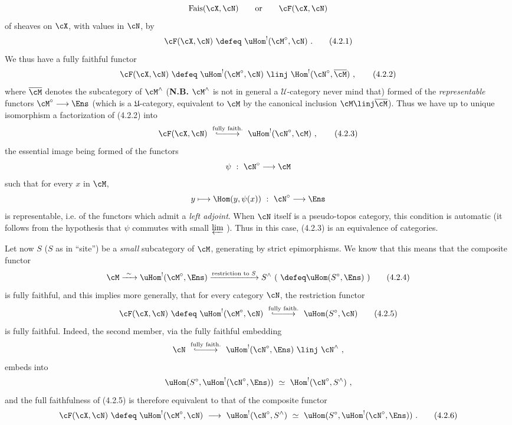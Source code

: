 \[
\mathrm{Fais}(\cX,\cN) \qquad \text{or} \qquad \cF(\cX,\cN)
\]
of sheaves on $\cX$, with values in $\cN$, by
\[
\cF(\cX,\cN) \ \defeq\ \uHom^{!}(\cM^{\circ},\cN) \ .
\tag*{(4.2.1)}
\]
We thus have a fully faithful functor
\[
\cF(\cX,\cN) \ \defeq\ \uHom^{!}(\cM^{\circ},\cN) \ \linj\ \Hom^{!}(\cN^{\circ},\overline{\cM}) \ ,
\tag*{(4.2.2)}
\]
where $\overline{\cM}$ denotes the subcategory of $\cM^{\wedge}$ (\textbf{N.B.} $\cM^{\wedge}$ is not in general a $\mathcal{U}$-category never mind that) formed of the \textit{representable} functors $\cM^{\circ}\longrightarrow\Ens$ (which is a $\mathfrak{U}$-category, equivalent to $\cM$ by the canonical inclusion $\cM \linj \overline{\cM}$). Thus we have up to unique isomorphism a factorization of (4.2.2) into
\[
\cF(\cX,\cN) \ \overset{\text{fully faith.}}{\lhook\joinrel\relbar\joinrel\relbar\joinrel\longrightarrow}\ \uHom^{!}(\cN^{\circ},\cM) \ ,
\tag*{(4.2.3)}
\]
the essential image being formed of the functors
\[
\psi \ :\ \cN^{\circ} \longrightarrow \cM
\]
such that for every $x$ in $\cM$,
\[
y \longmapsto \Hom(y,\psi(x)) \ :\ \cN^{\circ} \longrightarrow \Ens
\]
is representable, i.e. of the functors which
admit a \textit{left adjoint}. When $\cN$ itself is a pseudo-topos category, this condition is automatic (it follows from the hypothesis that $\psi$ commutes with small $\varprojlim$ ). Thus in this case, (4.2.3) is an equivalence of categories.

Let now $S$ ($S$ as in ``site'') be a \textit{small} subcategory of $\cM$, generating by strict epimorphisms. We know that this means that the composite functor
\[
\cM \xrightarrow{\ \sim\ } \uHom^{!}(\cM^{\circ},\Ens) \xrightarrow{\text{restriction to } S} S^{\wedge} \ (\ \defeq \uHom(S^{\circ},\Ens)\ )
\tag*{(4.2.4)}
\]
is fully faithful, and this implies more generally, that for every category $\cN$, the restriction functor
\[
\cF(\cX,\cN) \ \defeq\ \uHom^{!}(\cM^{\circ},\cN) \ \overset{\text{fully faith.}}{\lhook\joinrel\relbar\joinrel\relbar\joinrel\longrightarrow}\ \uHom(S^{\circ},\cN)
\tag*{(4.2.5)}
\]
is fully faithful. Indeed, the second member, via the fully faithful embedding
\[
\cN \ \overset{\text{fully faith.}}{\lhook\joinrel\relbar\joinrel\relbar\joinrel\longrightarrow}\ \uHom^{!}(\cN^{\circ},\Ens) \ \linj\ \cN^{\wedge} \ ,
\]
embeds into
\[
\uHom(S^{\circ},\uHom^{!}(\cN^{\circ},\Ens)) \ \simeq\ \Hom^{!}(\cN^{\circ},S^{\wedge}) \ ,
\]
and the full faithfulness of (4.2.5) is therefore equivalent to that of the composite functor
\[
\cF(\cX,\cN) \ \defeq\ \uHom^{!}(\cM^{\circ},\cN) \ \longrightarrow\ \uHom^{!}(\cN^{\circ},S^{\wedge}) \ \simeq\ \uHom(S^{\circ},\uHom^{!}(\cN^{\circ},\Ens)) \ .
\tag*{(4.2.6)}
\]

